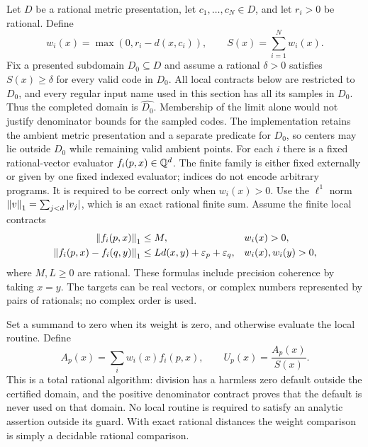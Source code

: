 Let $D$ be a rational metric presentation, let $c_1,\ldots,c_N\in D$,
and let $r_i>0$ be rational.  Define
\[
 w_i(x)=\max(0,r_i-d(x,c_i)),
 \qquad S(x)=\sum_{i=1}^N w_i(x).
\]
Fix a presented subdomain $D_0\subseteq D$ and assume a rational
$\delta>0$ satisfies $S(x)\ge\delta$ for every valid code in $D_0$.
All local contracts below are restricted to $D_0$, and every regular
input name used in this section has all its samples in $D_0$.
Thus the completed domain is $\widehat{D_0}$.  Membership of the limit
alone would not justify denominator bounds for the sampled codes.
The implementation retains the ambient metric presentation and a
separate predicate for $D_0$, so centers may lie outside $D_0$ while
remaining valid ambient points.  For each $i$ there is a fixed rational-vector
evaluator $f_i(p,x)\in\mathbb Q^d$.  The finite family is either fixed
externally or given by one fixed indexed evaluator; indices do not
encode arbitrary programs.  It is required to be correct only when
$w_i(x)>0$.  Use the $\ell^1$ norm
$\left\lVert v\right\rVert_1=\sum_{j<d}|v_j|$, which is an exact rational finite sum.
Assume the finite local contracts
\begin{align}
 \left\lVert f_i(p,x)\right\rVert_1&\le M,
 && w_i(x)>0,
 \label{eq:an-local-bound}\\
 \left\lVert f_i(p,x)-f_i(q,y)\right\rVert_1
 &\le Ld(x,y)+\varepsilon_p+\varepsilon_q,
 && w_i(x),w_i(y)>0,
 \label{eq:an-local-lip}
\end{align}
where $M,L\ge0$ are rational.  These formulas include precision
coherence by taking $x=y$.  The targets can be real vectors, or complex
numbers represented by pairs of rationals; no complex order is used.

Set a summand to zero when its weight is zero, and otherwise evaluate
the local routine.  Define
\begin{equation}
 A_p(x)=\sum_i w_i(x)f_i(p,x),
 \qquad U_p(x)=\frac{A_p(x)}{S(x)}.
 \label{eq:an-glue}
\end{equation}
This is a total rational algorithm: division has a harmless zero
default outside the certified domain, and the positive denominator
contract proves that the default is never used on that domain.  No
local routine is required to satisfy an analytic assertion outside its
guard.  With exact rational distances the weight comparison is simply
a decidable rational comparison.

